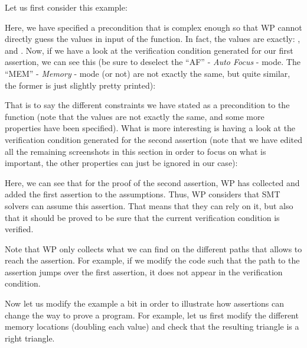 Let us first consider this example:






Here, we have specified a precondition that is complex enough so that WP cannot
directly guess the values in input of the function. In fact, the values are
exactly: ,  and .
Now, if we have a look at the verification condition generated for our first
assertion, we can see this (be sure to deselect the ``AF'' - \textit{Auto Focus} -
mode. The ``MEM'' - \textit{Memory} - mode (or not) are not exactly the same,
but quite similar, the former is just slightly pretty printed):




That is to say the different constraints we have stated as a precondition to the
function (note that the values are not exactly the same, and some more properties
have been specified). What is more interesting is having a look
at the verification condition generated for the second assertion (note that we
have edited all the remaining screenshots in this section in order to focus on
what is important, the other properties can just be ignored in our case):




Here, we can see that for the proof of the second assertion, WP has collected
and added the first assertion to the assumptions. Thus, WP considers that SMT
solvers can assume this assertion. That means that they can rely on it, but also
that it should be proved to be sure that the current verification condition is
verified.


Note that WP only collects what we can find on the different paths that allows
to reach the assertion. For example, if we modify the code such that the path
to the assertion jumps over the first assertion, it does not appear in the
verification condition.







Now let us modify the example a bit in order to illustrate how assertions
can change the way to prove a program. For example, let us first modify the
different memory locations (doubling each value) and check that the resulting
triangle is a right triangle.






